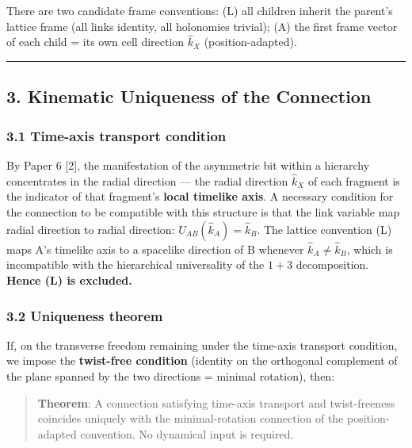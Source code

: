 \documentclass[
]{article}
\begin{document}
There are two candidate frame conventions: (L) all children inherit the
parent's lattice frame (all links identity, all holonomies trivial); (A)
the first frame vector of each child = its own cell direction
\(\hat k_X\) (position-adapted).

\begin{center}\rule{0.5\linewidth}{0.5pt}\end{center}

\subsection{3. Kinematic Uniqueness of the
Connection}\label{kinematic-uniqueness-of-the-connection}

\subsubsection{3.1 Time-axis transport
condition}\label{time-axis-transport-condition}

By Paper 6 {[}2{]}, the manifestation of the asymmetric bit within a
hierarchy concentrates in the radial direction --- the radial direction
\(\hat k_X\) of each fragment is the indicator of that fragment's
\textbf{local timelike axis}. A necessary condition for the connection
to be compatible with this structure is that the link variable map
radial direction to radial direction: \(U_{AB}(\hat k_A)=\hat k_B\). The
lattice convention (L) maps A's timelike axis to a spacelike direction
of B whenever \(\hat k_A\ne\hat k_B\), which is incompatible with the
hierarchical universality of the \(1{+}3\) decomposition. \textbf{Hence
(L) is excluded.}

\subsubsection{3.2 Uniqueness theorem}\label{uniqueness-theorem}

If, on the transverse freedom remaining under the time-axis transport
condition, we impose the \textbf{twist-free condition} (identity on the
orthogonal complement of the plane spanned by the two directions =
minimal rotation), then:

\begin{quote}
\textbf{Theorem}: A connection satisfying time-axis transport and
twist-freeness coincides uniquely with the minimal-rotation connection
of the position-adapted convention. No dynamical input is required.
\end{quote}
\end{document}

